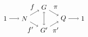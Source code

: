 \begin{equation}
    \begin{tikzpicture}
        \node (A) at (-2,0) {$1$};
        \node (B) at (-1,0) {$N$};
        \draw[->] (A) -- (B);
        \node (C) at (0, 0.6) {$G$};
        \node (D) at (0, -0.6) {$G'$};
        \draw [<->] (C) -- (D);
        \draw [->] (B) -- (C);
        \draw [->] (B) -- (D);
        \node (E) at (1, 0) {$Q$};
        \draw [->] (C) -- (E);
        \draw [->] (D) -- (E);
        \node (F) at (2, 0) {$1$};
        \draw [->] (E) -- (F);
        \node at (-0.6, 0.6) {$f$};
        \node at (-0.7, -0.6) {$f'$};
        \node at (0.6, 0.6) {$\pi$};
        \node at (0.6, -0.6) {$\pi'$};
    \end{tikzpicture}
    \label{eq:equivalent-commuting-diagram}
\end{equation}